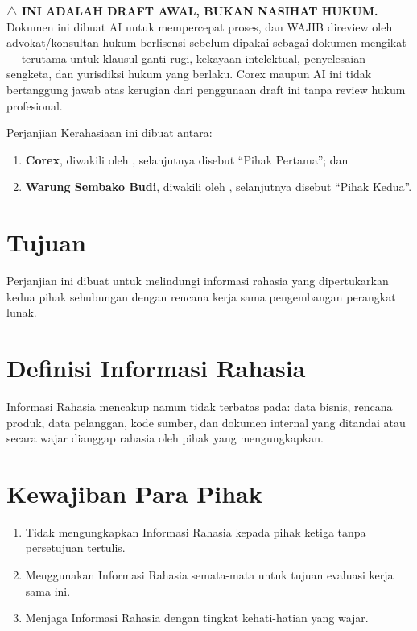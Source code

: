 \documentclass[11pt]{article}
\newcommand{\CorexClientName}{Warung Sembako Budi}
\begin{document}


\begin{corexdisclaimer}
\textbf{$\bigtriangleup$ INI ADALAH DRAFT AWAL, BUKAN NASIHAT HUKUM.} Dokumen ini
dibuat AI untuk mempercepat proses, dan WAJIB direview oleh advokat/konsultan
hukum berlisensi sebelum dipakai sebagai dokumen mengikat --- terutama untuk
klausul ganti rugi, kekayaan intelektual, penyelesaian sengketa, dan
yurisdiksi hukum yang berlaku. Corex maupun AI ini tidak bertanggung jawab
atas kerugian dari penggunaan draft ini tanpa review hukum profesional.
\end{corexdisclaimer}

\vspace{0.5cm}
\noindent Perjanjian Kerahasiaan ini dibuat antara:

\begin{enumerate}[leftmargin=1.6em]
  \item \textbf{Corex}, diwakili oleh , selanjutnya disebut ``Pihak Pertama''; dan
  \item \textbf{\CorexClientName}, diwakili oleh , selanjutnya disebut ``Pihak Kedua''.
\end{enumerate}

\section{Tujuan}
Perjanjian ini dibuat untuk melindungi informasi rahasia yang dipertukarkan
kedua pihak sehubungan dengan rencana kerja sama pengembangan perangkat
lunak.

\section{Definisi Informasi Rahasia}
Informasi Rahasia mencakup namun tidak terbatas pada: data bisnis, rencana
produk, data pelanggan, kode sumber, dan dokumen internal yang ditandai
atau secara wajar dianggap rahasia oleh pihak yang mengungkapkan.

\section{Kewajiban Para Pihak}
\begin{enumerate}[leftmargin=1.6em]
  \item Tidak mengungkapkan Informasi Rahasia kepada pihak ketiga tanpa persetujuan tertulis.
  \item Menggunakan Informasi Rahasia semata-mata untuk tujuan evaluasi kerja sama ini.
  \item Menjaga Informasi Rahasia dengan tingkat kehati-hatian yang wajar.
\end{enumerate}
\end{document}

